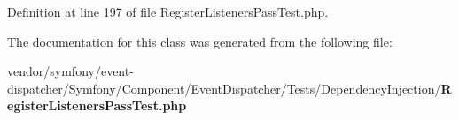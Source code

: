 Definition at line 197 of file Register\+Listeners\+Pass\+Test.\+php.



The documentation for this class was generated from the following file\+:\begin{DoxyCompactItemize}
\item 
vendor/symfony/event-\/dispatcher/\+Symfony/\+Component/\+Event\+Dispatcher/\+Tests/\+Dependency\+Injection/{\bf Register\+Listeners\+Pass\+Test.\+php}\end{DoxyCompactItemize}

